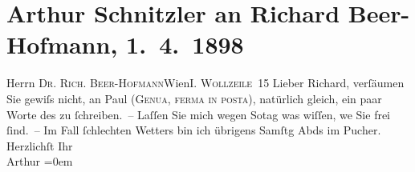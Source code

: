 

         
         \renewcommand{\erwaehntePersonen}{Personen: Richard Beer-Hofmann, Paul Goldmann}
         \renewcommand{\erwaehnteOrte}{Orte: Café Pucher, China, Genua, I., Innere Stadt, IX., Alsergrund, Wien, Wollzeile}
         \renewcommand{\erwaehnteWerke}{}
               \section[Arthur Schnitzler an Richard Beer-Hofmann, 1. 4. 1898]{ Arthur Schnitzler an Richard Beer-Hofmann, 1. 4. 1898}\nopagebreak{}\rehead{ }\begin{ledgroupsized}[t]{13cm}\normalsize\beginnumbering \toendnotes[C]{\smallbreak\pagebreak[2]} 
\toendnotes[C]{\smallbreak}\pstart{}{\pb}Herrn \textsc{Dr. Rich.
                     Beer-Hofmann}\pend{}\pstart{}Wien\pend{}\pstart{}\textsc{I.
                     Wollzeile 15}\pend{}{\bigskip}\pstart
           \noindent{}{\pb}Lieber Richard, verſäumen Sie gewiſs nicht, an Paul (\textsc{Genua}, \textsc{ferma in posta}), natürlich
               gleich, ein paar Worte des \label{K_L00789_1v}\label{K_L00789_1h} zu ſchreiben. – Laſſen Sie mich wegen So{\geminationn}tag was {\pb}wiſſen,
                  we{\geminationn}{ }Sie frei ſind. –\pend
           \pstart
           Im Fall ſchlechten Wetters bin ich übrigens Samſtg Abds im Pucher.\pend
           \pstart
           Herzlichſt Ihr {\\[\baselineskip]}\spacefill\mbox{Arthur}\pend
           \leftskip=0em{}
         
         \endnumbering{}\end{ledgroupsized}  \newcommand{\dateiname}{L00789}\newcommand{\titel}{Arthur Schnitzler an Richard Beer-Hofmann, 1. 4. 1898}\newcommand{\editorInnen}{Martin Anton Müller und Gerd-Hermann Susen}
      